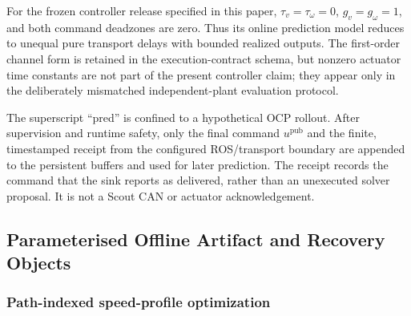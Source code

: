 For the frozen controller release specified in this paper,
$\tau_v=\tau_\omega=0$, $g_v=g_\omega=1$, and both command deadzones are zero.
Thus its online prediction model reduces to unequal pure transport delays with
bounded realized outputs.  The first-order channel form is retained in the
execution-contract schema, but nonzero actuator time constants are not part of
the present controller claim; they appear only in the deliberately mismatched
independent-plant evaluation protocol.

The superscript ``pred'' is confined to a hypothetical OCP rollout.  After
supervision and runtime safety, only the final command $u^{\mathrm{pub}}$ and
the finite, timestamped receipt from the configured ROS/transport boundary are
appended to the persistent buffers and used for later prediction.  The receipt
records the command that the sink reports as delivered, rather than an
unexecuted solver proposal.  It is not a Scout CAN or actuator acknowledgement.

\subsection{Parameterised Offline Artifact and Recovery Objects}

\subsubsection{Path-indexed speed-profile optimization}


